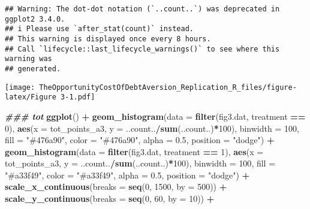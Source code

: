 \documentclass[
]{article}
\newenvironment{Shaded}{\begin{snugshade}}{\end{snugshade}}
\newcommand{\AttributeTok}[1]{\textcolor[rgb]{0.13,0.29,0.53}{#1}}
\newcommand{\DecValTok}[1]{\textcolor[rgb]{0.00,0.00,0.81}{#1}}
\newcommand{\DocumentationTok}[1]{\textcolor[rgb]{0.56,0.35,0.01}{\textbf{\textit{#1}}}}
\newcommand{\FloatTok}[1]{\textcolor[rgb]{0.00,0.00,0.81}{#1}}
\newcommand{\FunctionTok}[1]{\textcolor[rgb]{0.13,0.29,0.53}{\textbf{#1}}}
\newcommand{\NormalTok}[1]{#1}
\newcommand{\SpecialCharTok}[1]{\textcolor[rgb]{0.81,0.36,0.00}{\textbf{#1}}}
\newcommand{\StringTok}[1]{\textcolor[rgb]{0.31,0.60,0.02}{#1}}
\begin{document}
\begin{verbatim}
## Warning: The dot-dot notation (`..count..`) was deprecated in ggplot2 3.4.0.
## i Please use `after_stat(count)` instead.
## This warning is displayed once every 8 hours.
## Call `lifecycle::last_lifecycle_warnings()` to see where this warning was
## generated.
\end{verbatim}

\texttt{[image: TheOpportunityCostOfDebtAversion\_Replication\_R\_files/figure-latex/Figure 3-1.pdf]}

\begin{Shaded}
\begin{Highlighting}[]
\DocumentationTok{\#\#\# tot}
\FunctionTok{ggplot}\NormalTok{() }\SpecialCharTok{+}
  \FunctionTok{geom\_histogram}\NormalTok{(}\AttributeTok{data =} \FunctionTok{filter}\NormalTok{(fig3.dat, treatment }\SpecialCharTok{==} \DecValTok{0}\NormalTok{),}
                 \FunctionTok{aes}\NormalTok{(}\AttributeTok{x =}\NormalTok{ tot\_points\_a3, }\AttributeTok{y =}\NormalTok{ ..count..}\SpecialCharTok{/}\FunctionTok{sum}\NormalTok{(..count..)}\SpecialCharTok{*}\DecValTok{100}\NormalTok{),}
                 \AttributeTok{binwidth =} \DecValTok{100}\NormalTok{, }\AttributeTok{fill =} \StringTok{"\#476a90"}\NormalTok{, }\AttributeTok{color =} \StringTok{"\#476a90"}\NormalTok{, }\AttributeTok{alpha =} \FloatTok{0.5}\NormalTok{, }\AttributeTok{position =} \StringTok{"dodge"}\NormalTok{) }\SpecialCharTok{+}
  \FunctionTok{geom\_histogram}\NormalTok{(}\AttributeTok{data =} \FunctionTok{filter}\NormalTok{(fig3.dat, treatment }\SpecialCharTok{==} \DecValTok{1}\NormalTok{),}
                 \FunctionTok{aes}\NormalTok{(}\AttributeTok{x =}\NormalTok{ tot\_points\_a3, }\AttributeTok{y =}\NormalTok{ ..count..}\SpecialCharTok{/}\FunctionTok{sum}\NormalTok{(..count..)}\SpecialCharTok{*}\DecValTok{100}\NormalTok{),}
                 \AttributeTok{binwidth =} \DecValTok{100}\NormalTok{, }\AttributeTok{fill =} \StringTok{"\#a33f49"}\NormalTok{, }\AttributeTok{color =} \StringTok{"\#a33f49"}\NormalTok{, }\AttributeTok{alpha =} \FloatTok{0.5}\NormalTok{, }\AttributeTok{position =} \StringTok{"dodge"}\NormalTok{) }\SpecialCharTok{+}
  \FunctionTok{scale\_x\_continuous}\NormalTok{(}\AttributeTok{breaks =} \FunctionTok{seq}\NormalTok{(}\DecValTok{0}\NormalTok{, }\DecValTok{1500}\NormalTok{, }\AttributeTok{by =} \DecValTok{500}\NormalTok{)) }\SpecialCharTok{+}
  \FunctionTok{scale\_y\_continuous}\NormalTok{(}\AttributeTok{breaks =} \FunctionTok{seq}\NormalTok{(}\DecValTok{0}\NormalTok{, }\DecValTok{60}\NormalTok{, }\AttributeTok{by =} \DecValTok{10}\NormalTok{)) }\SpecialCharTok{+}

\end{Highlighting}
\end{Shaded}
\end{document}
